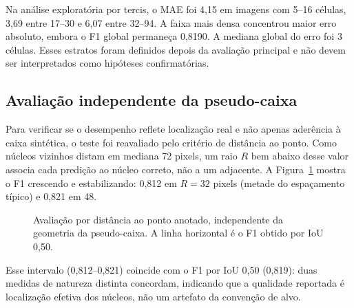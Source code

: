 Na an\'alise explorat\'oria por tercis, o MAE foi 4,15 em imagens com 5--16
c\'elulas, 3,69 entre 17--30 e 6,07 entre 32--94. A faixa mais densa concentrou
maior erro absoluto, embora o F1 global permane\c{c}a 0,8190. A mediana global
do erro foi 3 c\'elulas. Esses estratos foram definidos depois da avalia\c{c}\~ao
principal e n\~ao devem ser interpretados como hip\'oteses confirmat\'orias.

\FloatBarrier
\subsection{Avalia\c{c}\~ao independente da pseudo-caixa}

Para verificar se o desempenho reflete localiza\c{c}\~ao real e n\~ao apenas
ader\^encia \`a caixa sint\'etica, o teste foi reavaliado pelo crit\'erio de
dist\^ancia ao ponto. Como n\'ucleos vizinhos distam em mediana 72 pixels, um raio
$R$ bem abaixo desse valor associa cada predi\c{c}\~ao ao n\'ucleo correto, n\~ao a
um adjacente. A Figura~\ref{fig:dist-pgf} mostra o F1 crescendo e estabilizando:
0,812 em $R=32$ pixels (metade do espa\c{c}amento t\'ipico) e 0,821 em 48.

\begin{figure}[htbp]
\centering
{}
\caption{Avalia\c{c}\~ao por dist\^ancia ao ponto anotado, independente da geometria
da pseudo-caixa. A linha horizontal \'e o F1 obtido por IoU 0,50.}
\label{fig:dist-pgf}
\end{figure}

Esse intervalo (0,812--0,821) coincide com o F1 por IoU 0,50 (0,819): duas medidas
de natureza distinta concordam, indicando que a qualidade reportada \'e
localiza\c{c}\~ao efetiva dos n\'ucleos, n\~ao um artefato da conven\c{c}\~ao de alvo.
